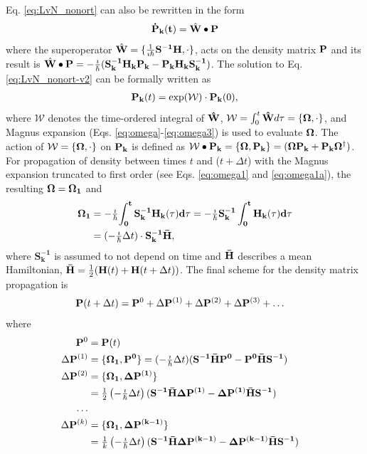 \documentclass[journal=jctcce,manuscript=article,etalmode=truncate,maxauthors=10,layout=twocolumn,9pt]{achemso}   %
\begin{document}
Eq.  \ref{eq:LvN_nonort} can also be rewritten in the form 
\begin{eqnarray}
 \mathbf{ \dot P_k(t) } =  \hat{\vb{ W}} \bullet \vb{P} 
 \label{eq:LvN_nonort-v2}
\end{eqnarray}
where the   superoperator  $\hat{\vb{ W}}= \{ \frac{1}{\imath \hbar}  \vb{S^{-1}H}, \cdot \}$, acts on the density matrix $\vb{P}$ 
and its result is  $\hat{\vb{ W}} \bullet \vb{P} =-\frac{\imath}{\hbar}( \mathbf{ S^{-1}_k  H_k P_k   - P_k H_k S_k^{-1}})$. 
 The  solution to Eq. \ref{eq:LvN_nonort-v2}  can be formally written as
\begin{align}
\vb{ P_k}(t) =  \exp(\mathcal{ W}) \cdot  \vb{P_k}(0),
\end{align}
 where  $\mathcal{ W}$ denotes the time-ordered integral of $\vb{\hat W}$, 
 $\mathcal{ W}= \int_0^t \vb{\hat W} d\tau=  \{\vb{\Omega},\cdot \}$, 
and Magnus expansion (Eqs. \ref{eq:omega}-\ref{eq:omega3})  is used to evaluate $\vb{\Omega}$.
The action of $\mathcal{ W}= \{\vb{\Omega}, \cdot \}$ on $\vb{P_k}$ is defined as   
 $\mathcal{ W} \bullet \vb{P_k} = \{ \vb{\Omega, P_k}  \}= (\vb{\Omega P_k +P_k\Omega^\dag})$.
For propagation of density between times $t$ and ($t+\Delta t$) with  the Magnus expansion truncated to first order 
(see Eqs. \ref{eq:omega1} and \ref{eq:omega1a}), 
the resulting  $\vb{\Omega= \Omega_1}$ and 
\begin{align}
\nonumber  
 \vb{\Omega_1} & =  -\tfrac{\imath}{\hbar} \vb{ \int_0^t S^{-1}_k  H_k(\tau) d\tau } 
   =  -\tfrac{\imath}{\hbar}   \vb{ S^{-1}_k \int_0^t H_k(\tau) d\tau }  \\
  &  = ( -\tfrac{\imath}{\hbar} \Delta t )\cdot \vb{ S^{-1}_k \bar  H},
\end{align}
where 
$\mathbf{  S^{-1}_k}$ is assumed  to not depend on time
and $\vb{\bar H}$ describes a mean  Hamiltonian,  $\vb{\bar H}=\tfrac{1}{2}(\vb{H}(t)+\vb{H}(t+\Delta t))$. 
 The final  scheme  for  the  density matrix  propagation is  
\begin{align}
\vb{P}(t+\Delta t) &=   \vb{P}^0   +  \Delta \vb{P}^{(1)} +  \Delta \vb{P}^{(2)} +  \Delta \vb{P}^{(3)} +  \ldots 
\label{eq:commutator-expansion-nonort-sum}
\end{align}
where  
\begin{align}
\nonumber       \vb{P}^0  &=  \vb{P}(t) \\
\nonumber \Delta \vb{P}^{(1)} &=  \vb{  \{ \Omega_1, P^0 \} } 
   = ( -\tfrac{\imath}{\hbar} \Delta t ) \vb{   (S^{-1}\bar{H} P^0 - P^0 \bar{H} S^{-1}) } \\
\nonumber \Delta \vb{P}^{(2)} &=  \vb{  \{ \Omega_1,\Delta  P^{(1)} \} }  \\
\nonumber    &= \tfrac{1}{2}  \left(  -\tfrac{\imath}{\hbar} \Delta t\right) \vb{   (S^{-1}\bar{H} \Delta P^{(1)} - \Delta P^{(1)} \bar{H} S^{-1}) } \\
\nonumber  \ldots& &\\
\nonumber \Delta \vb{P}^{(k)} &=  \vb{  \{ \Omega_1,\Delta  P^{(k-1)} \} }  \\
  &= \tfrac{1}{k}  \left(  -\tfrac{\imath}{\hbar} \Delta t\right) \vb{   (S^{-1}\bar{H} \Delta P^{(k-1)} - \Delta P^{(k-1)} \bar{H} S^{-1}) } 
\label{eq:commutator-expansion-nonort}
\end{align}
\end{document}
